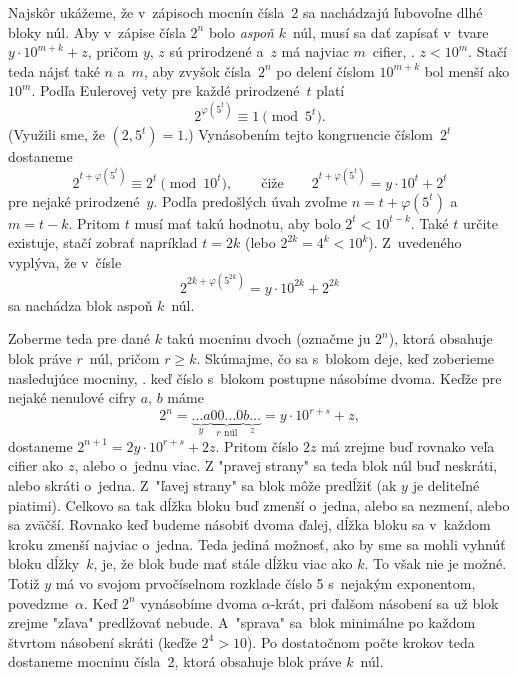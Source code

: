 {%
Najskôr ukážeme, že v~zápisoch mocnín čísla~2 sa nachádzajú ľubovoľne dlhé bloky núl. Aby v~zápise čísla $2^n$ bolo {\it aspoň} $k$~núl, musí sa dať zapísať v~tvare $y\cdot10^{m+k}+z$, pričom $y$, $z$ sú prirodzené a~$z$ má najviac $m$~cifier, \tj. $z<10^m$. Stačí teda nájsť také $n$ a~$m$, aby zvyšok čísla~$2^n$ po delení číslom $10^{m+k}$ bol menší ako $10^m$. Podľa Eulerovej vety pre každé prirodzené~$t$ platí
$$
  2^{\varphi(5^t)}\equiv 1\pmod{5^t}.
$$
(Využili sme, že $(2,5^t)=1$.) Vynásobením tejto kongruencie číslom~$2^t$ dostaneme
$$
  2^{t+\varphi(5^t)}\equiv 2^t\pmod{10^t},\qquad\text{čiže}\qquad 2^{t+\varphi(5^t)}= y\cdot10^t+2^t
$$
pre nejaké prirodzené~$y$. Podľa predošlých úvah zvoľme $n=t+\varphi(5^t)$ a~$m=t-k$. Pritom $t$ musí mať takú hodnotu, aby bolo $2^t<10^{t-k}$. Také $t$ určite existuje, stačí zobrať napríklad $t=2k$ (lebo $2^{2k}=4^k<10^k$).
Z~uvedeného vyplýva, že v~čísle
$$
  2^{2k+\varphi(5^{2k})}=y\cdot10^{2k}+2^{2k}
$$
sa nachádza blok aspoň $k$~núl.

Zoberme teda pre dané $k$ takú mocninu dvoch (označme ju $2^{n}$), ktorá obsahuje blok práve $r$~núl, pričom $r\ge k$. Skúmajme, čo sa s~blokom deje, keď zoberieme nasledujúce mocniny, \tj. keď číslo s~blokom postupne násobíme dvoma. Keďže pre nejaké nenulové cifry $a$, $b$ máme
$$
  2^{n}=\underbrace{\dots a}_y\underbrace{00\dots0}_{\text{$r$~núl}}\underbrace{b\dots}_z=y\cdot10^{r+s}+z,
$$
dostaneme $2^{n+1}=2y\cdot10^{r+s}+2z$. Pritom číslo $2z$ má zrejme buď rovnako veľa cifier ako $z$, alebo o~jednu viac. Z "pravej strany" sa teda blok núl buď neskráti, alebo skráti o~jedna. Z~"ľavej strany" sa blok môže predĺžiť (ak $y$ je deliteľné piatimi). Celkovo sa tak dĺžka bloku buď zmenší o~jedna, alebo sa nezmení, alebo sa zväčší.
Rovnako keď budeme násobiť dvoma ďalej, dĺžka bloku sa v~každom kroku zmenší najviac o~jedna. Teda jediná možnosť, ako by sme sa mohli vyhnúť bloku dĺžky~$k$, je, že blok bude mať stále dĺžku viac ako $k$. To však nie je možné. Totiž $y$ má vo svojom prvočíselnom rozklade číslo 5 s~nejakým exponentom, povedzme~$\alpha$. Keď $2^{n}$ vynásobíme dvoma $\alpha$-krát, pri ďalšom násobení sa už blok zrejme "zľava" predlžovať nebude. A~"sprava" sa~blok minimálne po každom štvrtom násobení skráti (keďže $2^4>10$). Po dostatočnom počte krokov teda dostaneme mocninu čísla~2, ktorá obsahuje blok práve $k$~núl.}

